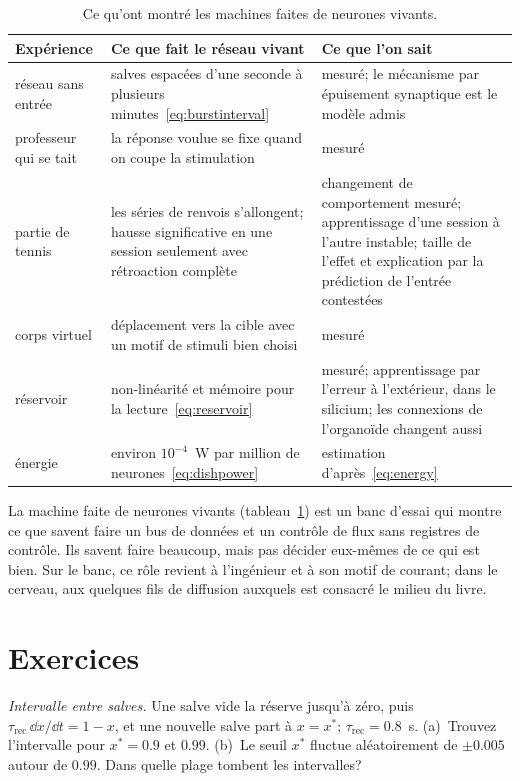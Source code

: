 \begin{table}[t]
\centering
\footnotesize
\setlength{\tabcolsep}{4pt}
\renewcommand{\arraystretch}{1.15}
\begin{tabular}{>{\raggedright}p{2.8cm}>{\raggedright}p{4.2cm}>{\raggedright\arraybackslash}p{5.8cm}}
\toprule
Expérience & Ce que fait le réseau vivant & Ce que l'on sait \\
\midrule
réseau sans entrée & salves espacées d'une seconde à plusieurs minutes~\eqref{eq:burstinterval} & mesuré; le mécanisme par épuisement synaptique est le modèle admis \\
professeur qui se tait & la réponse voulue se fixe quand on coupe la stimulation & mesuré \\
partie de tennis & les séries de renvois s'allongent; hausse significative en une session seulement avec rétroaction complète & changement de comportement mesuré; apprentissage d'une session à l'autre instable; taille de l'effet et explication par la prédiction de l'entrée contestées \\
corps virtuel & déplacement vers la cible avec un motif de stimuli bien choisi & mesuré \\
réservoir & non-linéarité et mémoire pour la lecture~\eqref{eq:reservoir} & mesuré; apprentissage par l'erreur à l'extérieur, dans le silicium; les connexions de l'organoïde changent aussi \\
énergie & environ $10^{-4}$~W par million de neurones~\eqref{eq:dishpower} & estimation d'après~\eqref{eq:energy} \\
\bottomrule
\end{tabular}
\caption{Ce qu'ont montré les machines faites de neurones vivants.}
\label{tab:livingmachine}
\end{table}

La machine faite de neurones vivants (tableau~\ref{tab:livingmachine}) est un banc d'essai qui montre ce que savent faire un bus de données et un contrôle de flux sans registres de contrôle. Ils savent faire beaucoup, mais pas décider eux-mêmes de ce qui est bien. Sur le banc, ce rôle revient à l'ingénieur et à son motif de courant; dans le cerveau, aux quelques fils de diffusion auxquels est consacré le milieu du livre.

\section{Exercices}

\begin{exercise}[\lvlA]
\label{ex:21:1}
\emph{Intervalle entre salves.} Une salve vide la réserve jusqu'à zéro, puis $\tau_{\text{rec}}\,\dd x/\dd t=1-x$, et une nouvelle salve part à $x=x^*$; $\tau_{\text{rec}}=0.8$~s. (a)~Trouvez l'intervalle pour $x^*=0.9$ et $0.99$. (b)~Le seuil $x^*$ fluctue aléatoirement de $\pm0.005$ autour de $0.99$. Dans quelle plage tombent les intervalles?
\end{exercise}


